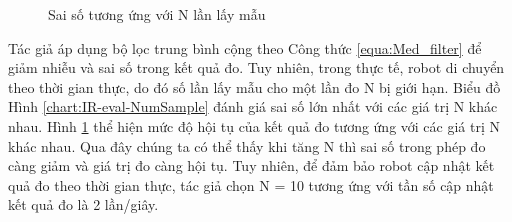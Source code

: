 {\begin{figure}[htbp]
\centering
{}
\hspace{8pt}
    \caption{Sai số tương ứng với N lần lấy mẫu}
    \label{fig:chart-IR-N-errorbar}
\end{figure}

Tác giả áp dụng bộ lọc trung bình cộng theo Công thức \ref{equa:Med_filter} để giảm nhiễu và sai số trong kết quả đo. Tuy nhiên, trong thực tế, robot di chuyển theo thời gian thực, do đó số lần lấy mẫu cho một lần đo N bị giới hạn. Biểu đồ Hình \ref{chart:IR-eval-NumSample} đánh giá sai số lớn nhất với các giá trị N khác nhau. Hình \ref{fig:chart-IR-N-errorbar} thể hiện mức độ hội tụ của kết quả đo tương ứng với các giá trị N khác nhau. Qua đây chúng ta có thể thấy khi tăng N thì sai số trong phép đo càng giảm và giá trị đo càng hội tụ. Tuy nhiên, để đảm bảo robot cập nhật kết quả đo theo thời gian thực, tác giả chọn N = 10 tương ứng với tần số cập nhật kết quả đo là 2 lần/giây.

}

